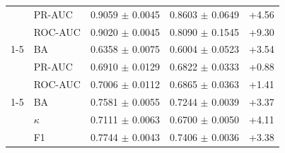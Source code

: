 \begin{table}[tbp]
\begin{tabular}{@{}l l c c c@{}}
 & PR-AUC & 0.9059 $\pm$ 0.0045 & 0.8603 $\pm$ 0.0649 & +4.56 \\
 & ROC-AUC & 0.9020 $\pm$ 0.0045 & 0.8090 $\pm$ 0.1545 & +9.30 \\
\cmidrule(lr){1-5}
\multirow{3}{*}{SHU-MI} & BA & 0.6358 $\pm$ 0.0075 & 0.6004 $\pm$ 0.0523 & +3.54 \\
 & PR-AUC & 0.6910 $\pm$ 0.0129 & 0.6822 $\pm$ 0.0333 & +0.88 \\
 & ROC-AUC & 0.7006 $\pm$ 0.0112 & 0.6865 $\pm$ 0.0363 & +1.41 \\
\cmidrule(lr){1-5}
\multirow{3}{*}{HMC} & BA & 0.7581 $\pm$ 0.0055 & 0.7244 $\pm$ 0.0039 & +3.37 \\
 & $\kappa$ & 0.7111 $\pm$ 0.0063 & 0.6700 $\pm$ 0.0050 & +4.11 \\
 & F1 & 0.7744 $\pm$ 0.0043 & 0.7406 $\pm$ 0.0036 & +3.38 \\
\bottomrule\end{tabular}\end{table}

